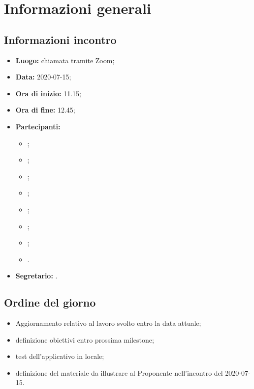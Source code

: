 \section{Informazioni generali}
\subsection{Informazioni incontro}
\begin{itemize}
	\item \textbf{Luogo:} chiamata tramite Zoom;
	\item \textbf{Data:} 2020-07-15;
	\item \textbf{Ora di inizio:} 11.15;
	\item \textbf{Ora di fine:} 12.45;
	\item \textbf{Partecipanti:}
		\begin{itemize}
			\item \VB;
			\item \LB;
			\item \NF;
			\item \EG;
			\item \FJ;
			\item \MP;
			\item \AS;
			\item \AZ.
		\end{itemize}
	\item \textbf{Segretario:} \NF.
\end{itemize}

\subsection{Ordine del giorno}
\begin{itemize}
	\item Aggiornamento relativo al lavoro svolto entro la data attuale;
	\item definizione obiettivi entro prossima milestone\textit{};
	\item test dell'applicativo in locale;
	\item definizione del materiale da illustrare al Proponente nell'incontro del 2020-07-15.
\end{itemize}
